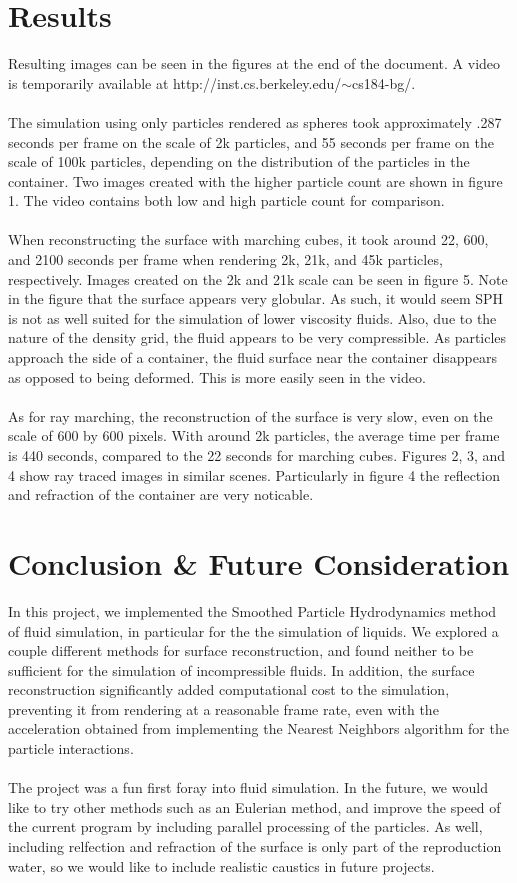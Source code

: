 \documentclass[11pt]{article}
\begin{document}
\section*{Results}
Resulting images can be seen in the figures at the end of the document.  A video is temporarily available at http://inst.cs.berkeley.edu/$\sim$cs184-bg/.
\\ \\
The simulation using only particles rendered as spheres took approximately .287 seconds per frame on the scale of 2k particles, and 55 seconds per frame on the scale of 100k particles, depending on the distribution of the particles in the container. Two images created with the higher particle count are shown in figure 1. The video contains both low and high particle count for comparison. 
\\ \\
When reconstructing the surface with marching cubes, it took around 22, 600, and 2100 seconds per frame when rendering 2k, 21k, and 45k particles, respectively. Images created on the 2k and 21k scale can be seen in figure 5. Note in the figure that the surface appears very globular. As such, it would seem SPH is not as well suited for the simulation of lower viscosity fluids. Also, due to the nature of the density grid, the fluid appears to be very compressible. As particles approach the side of a container, the fluid surface near the container disappears as opposed to being deformed. This is more easily seen in the video.
\\ \\
As for ray marching, the reconstruction of the surface is very slow, even on the scale of 600 by 600 pixels. With around 2k particles, the average time per frame is 440 seconds, compared to the 22 seconds for marching cubes. Figures 2, 3, and 4 show ray traced images in similar scenes. Particularly in figure 4 the reflection and refraction of the container are very noticable.

\section*{Conclusion \& Future Consideration}
In this project, we implemented the Smoothed Particle Hydrodynamics method of fluid simulation, in particular for the the simulation of liquids. We explored a couple different methods for surface reconstruction, and found neither to be sufficient for the simulation of incompressible fluids. In addition, the surface reconstruction significantly added computational cost to the simulation, preventing it from rendering at a reasonable frame rate, even with the acceleration obtained from implementing the Nearest Neighbors algorithm for the particle interactions.
\\ \\
The project was a fun first foray into fluid simulation. In the future, we would like to try other methods such as an Eulerian method, and improve the speed of the current program by including parallel processing of the particles. As well, including relfection and refraction of the surface is only part of the reproduction water, so we would like to include realistic caustics in future projects.
\end{document}
